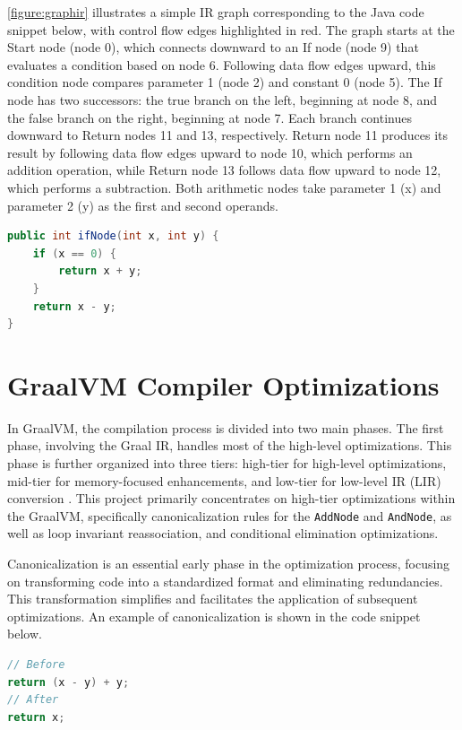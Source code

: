 \autoref{figure:graphir} illustrates a simple IR graph corresponding to the Java code snippet below, with control flow edges highlighted in red. The graph starts at the Start node (node 0), which connects downward to an If node (node 9) that evaluates a condition based on node 6. Following data flow edges upward, this condition node compares parameter 1 (node 2) and constant 0 (node 5). The If node has two successors: the true branch on the left, beginning at node 8, and the false branch on the right, beginning at node 7. Each branch continues downward to Return nodes 11 and 13, respectively. Return node 11 produces its result by following data flow edges upward to node 10, which performs an addition operation, while Return node 13 follows data flow upward to node 12, which performs a subtraction. Both arithmetic nodes take parameter 1 (x) and parameter 2 (y) as the first and second operands.

\begin{lstlisting}[language=Java]
public int ifNode(int x, int y) {
    if (x == 0) {
        return x + y;
    }
    return x - y;
}
\end{lstlisting}


\section{GraalVM Compiler Optimizations}

In GraalVM, the compilation process is divided into two main phases. The first phase, involving the Graal IR, handles most of the high-level optimizations. This phase is further organized into three tiers: high-tier for high-level optimizations, mid-tier for memory-focused enhancements, and low-tier for low-level IR (LIR) conversion \cite{Graal2021}. This project primarily concentrates on high-tier optimizations within the GraalVM, specifically canonicalization rules for the \texttt{AddNode} and \texttt{AndNode}, as well as loop invariant reassociation, and conditional elimination optimizations.

Canonicalization is an essential early phase in the optimization process, focusing on transforming code into a standardized format and eliminating redundancies. This transformation simplifies and facilitates the application of subsequent optimizations. 
An example of canonicalization is shown in the code snippet below.
\begin{lstlisting}[language=Java]
// Before
return (x - y) + y;
// After
return x;
\end{lstlisting}

